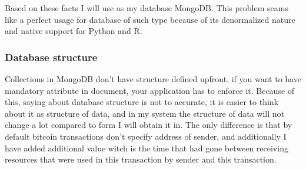 \documentclass[12pt, en, eng]{mgr}
\begin{document}
Based on these facts I will use as my database MongoDB. This problem seams like a perfect usage for database of such type because of its denormalized nature and native support for Python and R.


\subsubsection{Database structure}
 
Collections in MongoDB don't have structure defined upfront, if you want to have mandatory attribute in document, your application has to enforce it. Because of this, saying about database structure is not to accurate, it is easier to think about it as structure of data, and in my system the structure of data will not change a lot compared to form I will obtain it in. The only difference is that by default bitcoin transactions don't specify address of sender, and additionally I have added additional value witch is the time that had gone between receiving resources that were used in this transaction by sender and this transaction.
\end{document}
